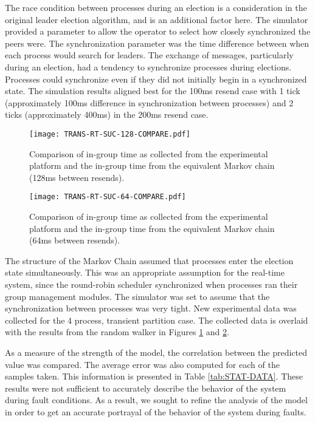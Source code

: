 The race condition between processes during an election is a consideration in the original leader election algorithm, and is an additional factor here.
The simulator provided a parameter to allow the operator to select how closely synchronized the peers were.
The synchronization parameter was the time difference between when each process would search for leaders.
The exchange of messages, particularly during an election, had a tendency to synchronize processes during elections.
Processes could synchronize even if they did not initially begin in a synchronized state. 
The simulation results aligned best for the 100ms resend case with 1 tick (approximately 100ms difference in synchronization between processes) and 2 ticks (approximately 400ms) in the 200ms resend case.

\begin{figure}
    \centering
    \texttt{[image: TRANS-RT-SUC-128-COMPARE.pdf]}
    \caption{Comparison of in-group time as collected from the experimental platform and the in-group time from the equivalent Markov chain (128ms between resends).}
    \label{fig:COMPARE-SUC-TRANS-RT-128}
\end{figure}

\begin{figure}
    \centering
    \texttt{[image: TRANS-RT-SUC-64-COMPARE.pdf]}
    \caption{Comparison of in-group time as collected from the experimental platform and the in-group time from the equivalent Markov chain (64ms between resends).}
    \label{fig:COMPARE-SUC-TRANS-RT-64}
\end{figure}

The structure of the Markov Chain assumed that processes enter the election state simultaneously.
This was an appropriate assumption for the real-time system, since the round-robin scheduler synchronized when processes ran their group management modules.
The simulator was set to assume that the synchronization between processes was very tight.
New experimental data was collected for the 4 process, transient partition case.
The collected data is overlaid with the results from the random walker in Figures \ref{fig:COMPARE-SUC-TRANS-RT-128} and \ref{fig:COMPARE-SUC-TRANS-RT-64}.

As a measure of the strength of the model, the correlation between the predicted value was compared.
The average error was also computed for each of the samples taken.
This information is presented in Table \ref{tab:STAT-DATA}.
These results were not sufficient to accurately describe the behavior of the system during fault conditions.
As a result, we sought to refine the analysis of the model in order to get an accurate portrayal of the behavior of the system during faults.

